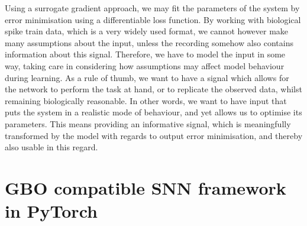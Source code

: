 \documentclass[mphil,deptreport,ianc]{infthesis} %
\begin{document}
Using a surrogate gradient approach, we may fit the parameters of the system by error minimisation using a differentiable loss function. 
By working with biological spike train data, which is a very widely used format, we cannot however make many assumptions about the input, unless the recording somehow also contains information about this signal. 
Therefore, we have to model the input in some way, taking care in considering how assumptions may affect model behaviour during learning. 
As a rule of thumb, we want to have a signal which allows for the network to perform the task at hand, or to replicate the observed data, whilst remaining biologically reasonable.
In other words, we want to have input that puts the system in a realistic mode of behaviour, and yet allows us to optimise its parameters.
This means providing an informative signal, which is meaningfully transformed by the model with regards to output error minimisation, and thereby also usable in this regard.


\section{GBO compatible SNN framework in PyTorch}

\end{document}
